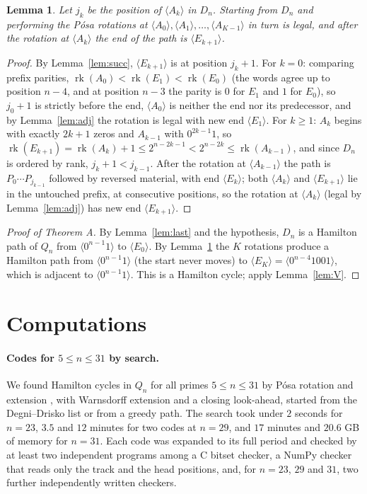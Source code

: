\documentclass[11pt]{article}
\newtheorem{lemma}{Lemma}
\newcommand{\rk}{\operatorname{rk}}
\begin{document}
\begin{lemma}\label{lem:legal}
Let $j_k$ be the position of $\langle A_k\rangle$ in $D_n$. Starting from $D_n$ and performing the P\'osa rotations at
$\langle A_0\rangle,\langle A_1\rangle,\dots,\langle A_{K-1}\rangle$ in turn is legal, and after the rotation at
$\langle A_k\rangle$ the end of the path is $\langle E_{k+1}\rangle$.
\end{lemma}
\begin{proof}
By Lemma~\ref{lem:succ}, $\langle E_{k+1}\rangle$ is at position $j_k+1$. For $k=0$: comparing prefix parities,
$\rk(A_0)<\rk(E_1)<\rk(E_0)$ (the words agree up to position $n-4$, and at position $n-3$ the parity is $0$ for
$E_1$ and $1$ for $E_0$), so $j_0+1$ is strictly before the end, $\langle A_0\rangle$ is neither the end nor its
predecessor, and by Lemma~\ref{lem:adj} the rotation is legal with new end $\langle E_1\rangle$. For $k\ge1$:
$A_k$ begins with exactly $2k+1$ zeros and $A_{k-1}$ with $0^{2k-1}1$, so
$\rk(E_{k+1})=\rk(A_k)+1\le 2^{n-2k-1}<2^{n-2k}\le\rk(A_{k-1})$, and since $D_n$ is ordered by rank,
$j_k+1<j_{k-1}$. After the rotation at $\langle A_{k-1}\rangle$ the path is $P_0\cdots P_{j_{k-1}}$ followed by
reversed material, with end $\langle E_k\rangle$; both $\langle A_k\rangle$ and $\langle E_{k+1}\rangle$ lie in the
untouched prefix, at consecutive positions, so the rotation at $\langle A_k\rangle$ (legal by
Lemma~\ref{lem:adj}) has new end $\langle E_{k+1}\rangle$.
\end{proof}

\begin{proof}[Proof of Theorem A]
By Lemma~\ref{lem:last} and the hypothesis, $D_n$ is a Hamilton path of $Q_n$ from $\langle0^{n-1}1\rangle$ to
$\langle E_0\rangle$. By Lemma~\ref{lem:legal} the $K$ rotations produce a Hamilton path from
$\langle0^{n-1}1\rangle$ (the start never moves) to $\langle E_K\rangle=\langle0^{n-4}1001\rangle$, which is adjacent
to $\langle0^{n-1}1\rangle$. This is a Hamilton cycle; apply Lemma~\ref{lem:V}.
\end{proof}

\section{Computations}\label{sec:comp}

\paragraph{Codes for $5\le n\le31$ by search.} We found Hamilton cycles in $Q_n$ for all primes $5\le n\le 31$ by
P\'osa rotation and extension \cite{Pos76}, with Warnsdorff extension and a closing look-ahead, started from the
Degni--Drisko list or from a greedy path. The search took under $2$ seconds for $n=23$, $3.5$ and $12$ minutes for two codes at $n=29$, and
$17$ minutes and $20.6$ GB of memory for $n=31$. Each code was expanded to its full period and checked by at least
two independent programs among a C bitset checker, a NumPy checker that reads only the track and the head positions,
and, for $n=23$, $29$ and $31$, two further independently written checkers.
\end{document}

